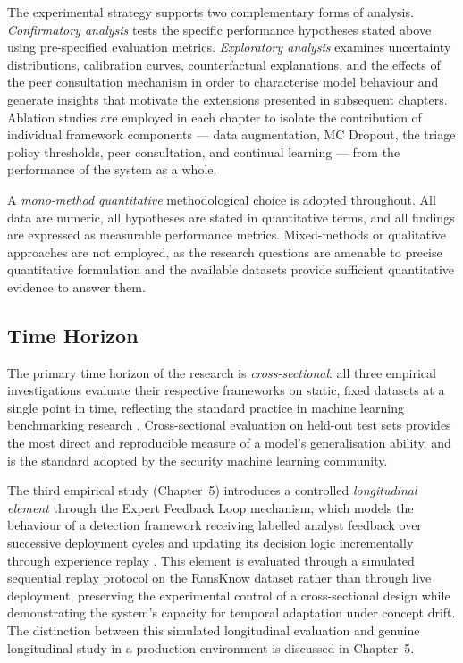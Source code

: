 The experimental strategy supports two complementary forms of analysis.
\emph{Confirmatory analysis} tests the specific performance hypotheses stated above using
pre-specified evaluation metrics.
\emph{Exploratory analysis} examines uncertainty distributions, calibration curves,
counterfactual explanations, and the effects of the peer consultation mechanism in order to
characterise model behaviour and generate insights that motivate the extensions presented in
subsequent chapters.
Ablation studies are employed in each chapter to isolate the contribution of individual
framework components — data augmentation, MC Dropout, the triage policy thresholds, peer
consultation, and continual learning — from the performance of the system as a whole.

A \emph{mono-method quantitative} methodological choice is adopted throughout.
All data are numeric, all hypotheses are stated in quantitative terms, and all findings are
expressed as measurable performance metrics.
Mixed-methods or qualitative approaches are not employed, as the research questions are
amenable to precise quantitative formulation and the available datasets provide sufficient
quantitative evidence to answer them.

\subsection{Time Horizon}
\label{sec:time_horizon}

The primary time horizon of the research is \emph{cross-sectional}: all three empirical
investigations evaluate their respective frameworks on static, fixed datasets at a single point
in time, reflecting the standard practice in machine learning benchmarking
research \cite{saunders2019research}.
Cross-sectional evaluation on held-out test sets provides the most direct and reproducible
measure of a model's generalisation ability, and is the standard adopted by the security
machine learning community.

The third empirical study (Chapter~5) introduces a controlled \emph{longitudinal element} through
the Expert Feedback Loop mechanism, which models the behaviour of a detection framework receiving
labelled analyst feedback over successive deployment cycles and updating its decision logic
incrementally through experience replay \cite{rolnick2019experience}.
This element is evaluated through a simulated sequential replay protocol on the RansKnow
dataset rather than through live deployment, preserving the experimental control of a
cross-sectional design while demonstrating the system's capacity for temporal adaptation under
concept drift.
The distinction between this simulated longitudinal evaluation and genuine longitudinal study
in a production environment is discussed in Chapter~5.

